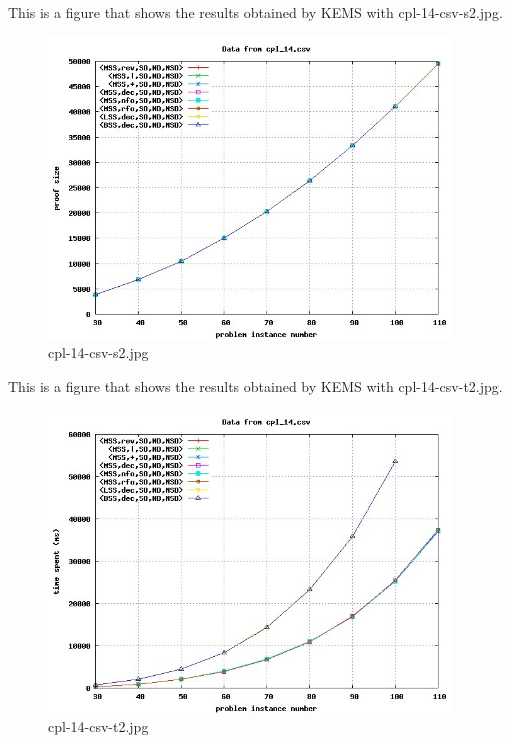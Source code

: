 This is a figure that shows the results obtained by KEMS with cpl-14-csv-s2.jpg.
\begin{figure}[htbp]
\begin{center}
\includegraphics[width=0.95\textwidth]{figuras/cpl-14-csv-s2.jpg}
\end{center}
\caption{cpl-14-csv-s2.jpg}
\end{figure}

This is a figure that shows the results obtained by KEMS with cpl-14-csv-t2.jpg.
\begin{figure}[htbp]
\begin{center}
\includegraphics[width=0.95\textwidth]{figuras/cpl-14-csv-t2.jpg}
\end{center}
\caption{cpl-14-csv-t2.jpg}
\end{figure}

